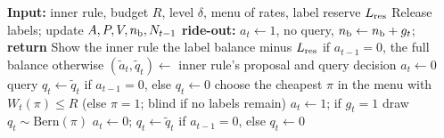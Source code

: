 \documentclass[10pt]{article}
\theoremstyle{plain}
\theoremstyle{definition}
\begin{document}
\begin{algorithm}[t]
\caption{One round of the risk-budget shield}\label{alg:shield}
\begin{algorithmic}
\STATE \textbf{Input:} inner rule, budget $R$, level $\delta$, menu of rates, label reserve $L_{\rm res}$
\STATE Release labels; update $A,P,V,n_{\rm b},N_{t-1}$
  \STATE \textbf{ride-out:} $a_t\leftarrow1$, no query, $n_{\rm b}\leftarrow n_{\rm b}+g_t$; \textbf{return} 
\ENDIF
\STATE Show the inner rule the label balance minus $L_{\rm res}$ if $a_{t-1}=0$, the full balance otherwise
\STATE $(\tilde a_t,\tilde q_t)\leftarrow$ inner rule's proposal and query decision
  \STATE $a_t\leftarrow0$ 
  \STATE query $q_t\leftarrow\tilde q_t$ if $a_{t-1}=0$, else $q_t\leftarrow0$ 
\ELSE
  \STATE choose the cheapest $\pi$ in the menu with $W_t(\pi)\le R$ (else $\pi=1$; blind if no labels remain)
   \STATE $a_t\leftarrow1$; if $g_t=1$ draw $q_t\sim\mathrm{Bern}(\pi)$ 
  \ELSE \STATE $a_t\leftarrow0$; $q_t\leftarrow\tilde q_t$ if $a_{t-1}=0$, else $q_t\leftarrow0$ 
  \ENDIF
\ENDIF
\end{algorithmic}
\end{algorithm}
\end{document}
